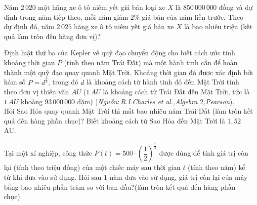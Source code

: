 \begin{ex}%
	Năm $2\,020$ một hãng xe ô tô niêm yết giá bán loại xe $X$ là $850\,000\,000$ đồng và dự định trong năm tiếp theo, mỗi năm giảm $2\%$ giá bán của năm liền trước. Theo dự định đó, năm $2\,025$ hãng xe ô tô niêm yết giá bán xe $X$ là bao nhiêu triệu (kết quả làm tròn đến hàng đơn vị)?\\
\end{ex}

\begin{ex}%
	Định luật thứ ba của Kepler về quỹ đạo chuyển động cho biết cách ước tính khoảng thời gian $P$ (tính theo năm Trái Đất) mà một hành tinh cần để hoàn thành một quỹ đạo quay quanh Mặt Trời. Khoảng thời gian đó được xác định bởi hàm số $P=d^{\tfrac{3}{2}}$, trong đó $d$ là khoảng cách từ hành tinh đó đến Mặt Trời tính theo đơn vị thiên văn $AU$ ($1\,AU$ là khoảng cách từ Trái Đất đến Mặt Trời, tức là $1\,AU$ khoảng $93\,000\,000$ dặm) (\textit{Nguồn$\colon$R.I.Charles et al.,Algebra $2$,Pearson}).\\
	Hỏi Sao Hỏa quay quanh Mặt Trời thì mất bao nhiêu năm Trái Đất (làm tròn kết quả đến hàng phần chục)? Biết khoảng cách từ Sao Hỏa đến Mặt Trời là $1{,}52$ AU.\\
\end{ex}


\begin{ex}
	Tại một xí nghiệp, công thức $P(t)=500 \cdot\left(\dfrac{1}{2}\right)^{\tfrac{t}{3}}$ được dùng để tính giá trị còn lại (tính theo triệu đồng) của một chiếc máy sau thời gian $t$ (tính theo năm) kể từ khi đưa vào sử dụng. Hỏi sau $1$ năm đưa vào sử dụng, giá trị còn lại của máy bằng bao nhiêu phần trăm so với ban đầu?(làm tròn kết quả đến hàng phần chục)\\
\end{ex}

